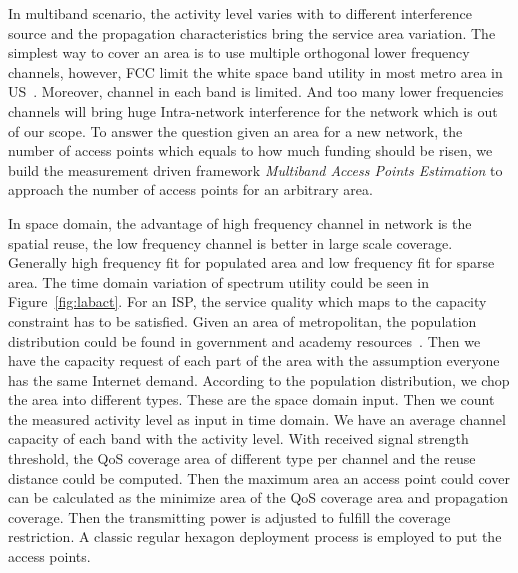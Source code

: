 In multiband scenario, the activity level varies with to different interference source and the propagation
characteristics bring the service area variation. The simplest way to cover an area is to use 
multiple orthogonal lower frequency channels, however, FCC limit the white space band utility in 
most metro area in US~\cite{googledatabase}. Moreover, channel in each band is limited. 
And too many lower frequencies channels will bring huge Intra-network interference for 
the network which is out of our scope. To answer the question given an area for a new network, 
the number of access points which equals to how much funding should be risen, we build the measurement driven
framework {\it Multiband Access Points Estimation} to approach the number of access points for
an arbitrary area.


In space domain, the advantage of high frequency channel in network is the spatial reuse, the low
frequency channel is better in large scale coverage. Generally high frequency fit
for populated area and low frequency fit for sparse area.
The time domain variation of spectrum utility could be seen in Figure~\ref{fig:labact}.
For an ISP, the service quality which maps to the capacity constraint has to be satisfied.
Given an area of metropolitan, the population distribution could be found in 
government and academy resources~\cite{uscensus}. Then we have the capacity request
of each part of the area with the assumption everyone has the same Internet demand. 
According to the population distribution, we chop the area into different types.
These are the space domain input. Then we count the measured activity level as 
input in time domain. We have an average channel capacity of each band with the 
activity level. With received signal strength threshold, 
the QoS coverage area of different type per channel and the reuse distance could be computed. 
Then the maximum area an access point could cover can be calculated as the minimize 
area of the QoS coverage area and propagation coverage.
Then the transmitting power is adjusted to fulfill the coverage restriction. 
A classic regular hexagon deployment process is employed to put the access points.

